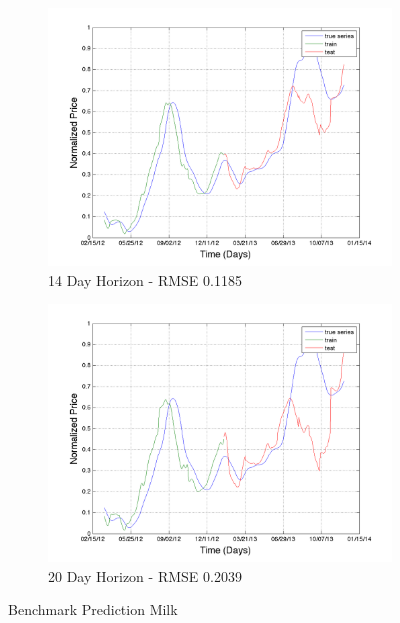 \begin{figure}
       \hfill
       
        \begin{subfigure}[b]{0.5\textwidth}
                \includegraphics[width=\textwidth]{img/model/milk/pred_14}
                \caption{14 Day Horizon - RMSE 0.1185}
                \label{fig:mouse}
        \end{subfigure}%
         \begin{subfigure}[b]{0.5\textwidth}
                \includegraphics[width=\textwidth]{img/model/milk/pred_20}
                \caption{20 Day Horizon - RMSE 0.2039}
                \label{fig:mouse}
        \end{subfigure}
        \caption{Benchmark Prediction Milk}\label{fig:animals}
\end{figure}











